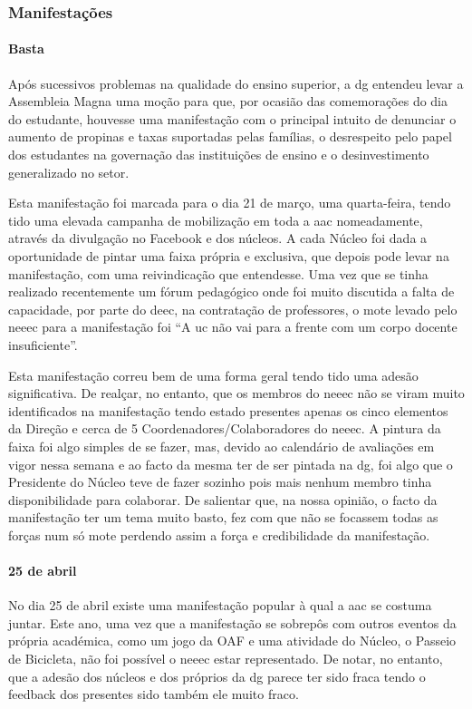
\subsubsection{Manifestações}

\paragraph{Basta}

Após sucessivos problemas na qualidade do ensino superior, a \acrshort{dg} entendeu levar a Assembleia Magna uma moção para que, por ocasião das comemorações do dia do estudante, houvesse uma manifestação com o principal intuito de denunciar o aumento de propinas e taxas suportadas pelas famílias, o desrespeito pelo papel dos estudantes na governação das instituições de ensino e o desinvestimento generalizado no setor.

Esta manifestação foi marcada para o dia 21 de março, uma quarta-feira, tendo tido uma elevada campanha de mobilização em toda a \acrshort{aac} nomeadamente, através da divulgação no Facebook e dos núcleos. A cada Núcleo foi dada a oportunidade de pintar uma faixa própria e exclusiva, que depois pode levar na manifestação, com uma reivindicação que entendesse. Uma vez que se tinha realizado recentemente um fórum pedagógico onde foi muito discutida a falta de capacidade, por parte do \acrshort{deec}, na contratação de professores, o mote levado pelo \acrshort{neeec} para a manifestação foi “A \acrshort{uc} não vai para a frente com um corpo docente insuficiente”.

Esta manifestação correu bem de uma forma geral tendo tido uma adesão significativa. De realçar, no entanto, que os membros do \acrshort{neeec} não se viram muito identificados na manifestação tendo estado presentes apenas os cinco elementos da Direção e cerca de 5 Coordenadores/Colaboradores do \acrshort{neeec}. A pintura da faixa foi algo simples de se fazer, mas, devido ao calendário de avaliações em vigor nessa semana e ao facto da mesma ter de ser pintada na \acrshort{dg}, foi algo que o Presidente do Núcleo teve de fazer sozinho pois mais nenhum membro tinha disponibilidade para colaborar. De salientar que, na nossa opinião, o facto da manifestação ter um tema muito basto, fez com que não se focassem todas as forças num só mote perdendo assim a força e credibilidade da manifestação.

\paragraph{25 de abril}

No dia 25 de abril existe uma manifestação popular à qual a \acrshort{aac} se costuma juntar. Este ano, uma vez que a manifestação se sobrepôs com outros eventos da própria académica, como um jogo da OAF e uma atividade do Núcleo, o Passeio de Bicicleta, não foi possível o \acrshort{neeec} estar representado. De notar, no entanto, que a adesão dos núcleos e dos próprios da \acrshort{dg} parece ter sido fraca tendo o feedback dos presentes sido também ele muito fraco.